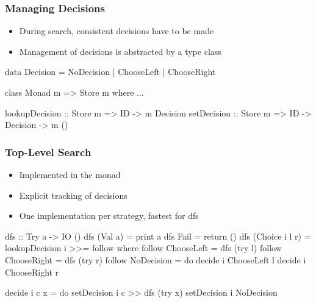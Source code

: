 \documentclass[%
,hyperref={pdfpagelabels=false}
,utf8
]{beamer}
\begin{document}
\begin{frame}[fragile]%
\frametitle{Managing Decisions}
\begin{itemize}
\item During search, consistent decisions have to be made
\item Management of decisions is abstracted by a type class
\end{itemize}

\begin{haskell}
data Decision = NoDecision
              | ChooseLeft
              | ChooseRight

class Monad m => Store m where ...

lookupDecision :: Store m => ID -> m Decision
setDecision    :: Store m => ID -> Decision -> m ()
\end{haskell}
\end{frame}

\begin{frame}[fragile]%
\frametitle{Top-Level Search}

\begin{itemize}
  \item Implemented in the  monad
  \item Explicit tracking of decisions
  \item One implementation per strategy, fastest for dfs
\end{itemize}

\begin{haskell}
dfs :: Try a -> IO ()
dfs (Val a)        = print a
dfs Fail           = return ()
dfs (Choice i l r) = lookupDecision i >>= follow
  where
  follow ChooseLeft  = dfs (try l)
  follow ChooseRight = dfs (try r)
  follow NoDecision  = do decide i ChooseLeft  l
                          decide i ChooseRight r

  decide i c x = do setDecision i c >> dfs (try x)
                    setDecision i NoDecision
\end{haskell}
\end{frame}
\end{document}

